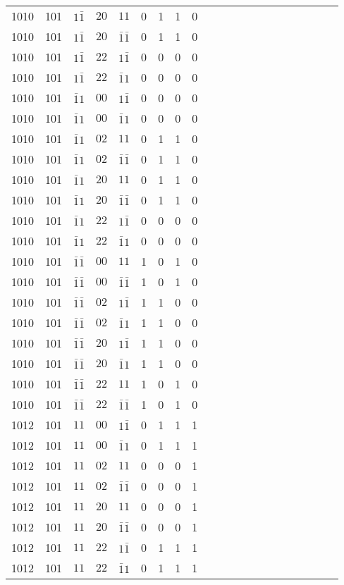 \begin{longtable*}{c| cccccccccccccccccccc }
1010& 101& $1\bar{1}$& $20$& $11$& 0& 1& 1& 0\\
1010& 101& $1\bar{1}$& $20$& $\bar{1}\bar{1}$& 0& 1& 1& 0\\
1010& 101& $1\bar{1}$& $22$& $1\bar{1}$& 0& 0& 0& 0\\
1010& 101& $1\bar{1}$& $22$& $\bar{1}1$& 0& 0& 0& 0\\
1010& 101& $\bar{1}1$& $00$& $1\bar{1}$& 0& 0& 0& 0\\
1010& 101& $\bar{1}1$& $00$& $\bar{1}1$& 0& 0& 0& 0\\
1010& 101& $\bar{1}1$& $02$& $11$& 0& 1& 1& 0\\
1010& 101& $\bar{1}1$& $02$& $\bar{1}\bar{1}$& 0& 1& 1& 0\\
1010& 101& $\bar{1}1$& $20$& $11$& 0& 1& 1& 0\\
1010& 101& $\bar{1}1$& $20$& $\bar{1}\bar{1}$& 0& 1& 1& 0\\
1010& 101& $\bar{1}1$& $22$& $1\bar{1}$& 0& 0& 0& 0\\
1010& 101& $\bar{1}1$& $22$& $\bar{1}1$& 0& 0& 0& 0\\
1010& 101& $\bar{1}\bar{1}$& $00$& $11$& 1& 0& 1& 0\\
1010& 101& $\bar{1}\bar{1}$& $00$& $\bar{1}\bar{1}$& 1& 0& 1& 0\\
1010& 101& $\bar{1}\bar{1}$& $02$& $1\bar{1}$& 1& 1& 0& 0\\
1010& 101& $\bar{1}\bar{1}$& $02$& $\bar{1}1$& 1& 1& 0& 0\\
1010& 101& $\bar{1}\bar{1}$& $20$& $1\bar{1}$& 1& 1& 0& 0\\
1010& 101& $\bar{1}\bar{1}$& $20$& $\bar{1}1$& 1& 1& 0& 0\\
1010& 101& $\bar{1}\bar{1}$& $22$& $11$& 1& 0& 1& 0\\
1010& 101& $\bar{1}\bar{1}$& $22$& $\bar{1}\bar{1}$& 1& 0& 1& 0\\
1012& 101& $11$& $00$& $1\bar{1}$& 0& 1& 1& 1\\
1012& 101& $11$& $00$& $\bar{1}1$& 0& 1& 1& 1\\
1012& 101& $11$& $02$& $11$& 0& 0& 0& 1\\
1012& 101& $11$& $02$& $\bar{1}\bar{1}$& 0& 0& 0& 1\\
1012& 101& $11$& $20$& $11$& 0& 0& 0& 1\\
1012& 101& $11$& $20$& $\bar{1}\bar{1}$& 0& 0& 0& 1\\
1012& 101& $11$& $22$& $1\bar{1}$& 0& 1& 1& 1\\
1012& 101& $11$& $22$& $\bar{1}1$& 0& 1& 1& 1\\

\end{longtable*}
